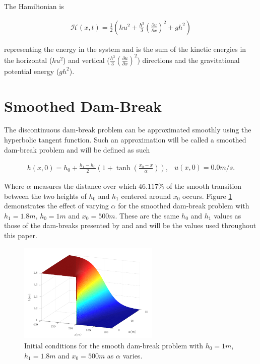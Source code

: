 \documentclass[SingleSpace,12pt,Proceedings]{Serre_ASCE}
\begin{document}
The Hamiltonian is
\begin{linenomath*}
\begin{gather}
\label{eqn:Hamildef}
\mathcal{H}(x,t) = \frac{1}{2} \left(hu^2 + \frac{h^3}{3} \left(\frac{\partial u}{\partial x}\right)^2 + gh^2\right)
\end{gather}
\end{linenomath*}
representing the energy in the system and is the sum of the kinetic energies in the horizontal ($hu^2$) and vertical ($\frac{h^3}{3} \left(\frac{\partial u}{\partial x}\right)^2$) directions and the gravitational potential energy ($gh^2$).   

\section{Smoothed Dam-Break}
\label{section:smootheddambreak}
The discontinuous dam-break problem can be approximated smoothly using the hyperbolic tangent function. Such an approximation will be called a smoothed dam-break problem and will be defined as such
\begin{linenomath*}
\begin{subequations}
\begin{gather}
h(x,0) = h_0 + \frac{h_1 - h_0}{2}\left(1 + \tanh\left(\frac{x_0 - x}{\alpha}\right)\right),
\end{gather}
\begin{gather}
u(x,0) = 0.0m/s.
\end{gather}
\label{eq:sdbi}
\end{subequations}
\end{linenomath*}
Where $\alpha$ measures the distance over which $46.117\%$ of the smooth transition between the two heights of $h_0$ and $h_1$ centered around $x_0$ occurs. Figure \ref{fig:dbsmoothinit} demonstrates the effect of varying $\alpha$ for the smoothed dam-break problem with $h_1 =1.8m$, $h_0 = 1m$ and $x_0 = 500m$. These are the same $h_0$ and $h_1$ values as those of the dam-breaks presented by  and  and will be the values used throughout this paper.
\begin{figure}
\centering
\includegraphics[width=0.6\textwidth]{pics/explainers/dbs.pdf}
\caption{Initial conditions for the smooth dam-break problem with $h_0 = 1m$, $h_1 = 1.8m$ and $x_0 =500m$ as $\alpha$ varies.}
\label{fig:dbsmoothinit}
\end{figure}
%
\end{document}
